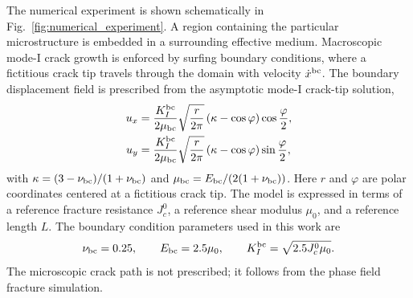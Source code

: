 \documentclass[pamm,a4paper,fleqn]{w-art}
\newcommand{\replaced}[3][]{#3}
\begin{document}
The numerical experiment is shown schematically in
Fig.~\ref{fig:numerical_experiment}. A region containing the
particular
microstructure is embedded in a surrounding effective medium.
Macroscopic mode-I crack growth is enforced by surfing boundary
conditions, where a fictitious crack tip travels through the domain
with velocity \(\replaced{\dot{x}_{\rm bc}}{\dot{x}^{\rm bc}}\). The
boundary displacement field is prescribed from the asymptotic mode-I
crack-tip solution,
\begin{align}
  u_x & = \frac{K_I^{\rm bc}}{2\mu_{\rm bc}}
  \sqrt{\frac{r}{2\pi}}
  \left(\kappa-\cos\varphi\right)
  \cos\frac{\varphi}{2}, \\
  u_y & = \frac{K_I^{\rm bc}}{2\mu_{\rm bc}}
  \sqrt{\frac{r}{2\pi}}
  \left(\kappa-\cos\varphi\right)
  \sin\frac{\varphi}{2},
  \label{eq:surfing-bcs}
\end{align}
with \(\kappa=(3-\nu_{\rm bc})/(1+\nu_{\rm bc})\) and
\(\mu_{\rm bc}=E_{\rm bc}/(2(1+\nu_{\rm bc}))\). Here \(r\) and
\(\varphi\) are polar coordinates centered at a fictitious crack
tip. The model is expressed in terms of a reference fracture
resistance \(J_c^0\), a reference shear modulus \(\mu_0\), and a
reference length \(L\). The boundary condition parameters used in
this work are
\begin{equation}
  \nu_{\rm bc}=0.25,\qquad
  E_{\rm bc}=2.5\mu_0,\qquad
  K_I^{\rm bc}=\sqrt{2.5J_c^0\mu_0}.
\end{equation}
The microscopic crack path is not prescribed; it follows from the
phase field fracture simulation.
\end{document}
